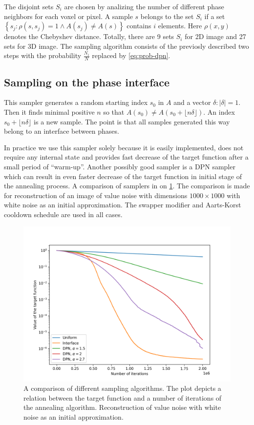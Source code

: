 \documentclass[preprint,amsmath,amssymb,aps,pre,nofootinbib]{revtex4-1}
\begin{document}
The disjoint sets $S_i$ are chosen by analizing the number of different phase
neighbors for each voxel or pixel. A sample $s$ belongs to the set $S_i$ if a
set $\left\{ s_j: \rho(s, s_j) = 1 \land A(s_j) \ne A(s) \right\}$  contains $i$
elements. Here $\rho(x,y)$ denotes the Chebyshev distance. Totally, there are 9
sets $S_i$ for 2D image and 27 sets for 3D image. The sampling algorithm
consists of the previosly described two steps with the probability
$\frac{N_i}{N}$ replaced by \cref{eq:prob-dpn}.

\subsection{Sampling on the phase interface}
\label{sec:sampler-interface}
This sampler generates a random starting index $s_0$ in $A$ and a vector
$\delta: |\delta| = 1$. Then it finds minimal positive $n$ so that
$A(s_0) \ne A(s_0 + \lfloor n\delta \rfloor)$. An index
$s_0 + \lfloor n\delta \rfloor$ is a new sample. The point is that all samples
generated this way belong to an interface between phases.

In practice we use this sampler solely because it is easily implemented, does
not require any internal state and provides fast decrease of the target function
after a small period of ``warm-up''. Another possibly good sampler is a DPN
sampler which can result in even faster decrease of the target function in
initial stage of the annealing process. A comparison of samplers in on
\cref{fig:sampler-comparison}. The comparison is made for reconstruction of an
image of value noise with dimensions $1000 \times 1000$ with white noise as an
initial approximation. The swapper modifier and Aarts-Korst cooldown schedule
are used in all cases.

\begin{figure}[ht]
  \centering
  \includegraphics[width=0.9\linewidth]{../target-plots/sampler-comparison.png}
  \caption[]{A comparison of different sampling algorithms. The plot depicts a
    relation between the target function and a number of iterations of the
    annealing algorithm. Reconstruction of value noise with white noise as an
    initial approximation.}
  \label{fig:sampler-comparison}
\end{figure}
\end{document}

